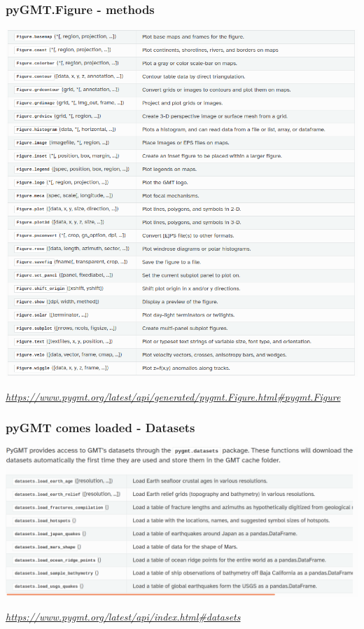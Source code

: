 \documentclass[unknownkeysallowed]{beamer}
\begin{document}
\begin{frame}[fragile=singleslide]
\frametitle{pyGMT.Figure - methods}
	\begin{center}
			\includegraphics[width=\textwidth]{../figures/pygmt_figure_methods.png}	
	\end{center}
	\begin{flushright}
	\vspace{-0.35cm}
	\tiny{\emph{\url{https://www.pygmt.org/latest/api/generated/pygmt.Figure.html\#pygmt.Figure}}}
	\end{flushright}	
\end{frame}


\begin{frame}[fragile=singleslide]
\frametitle{pyGMT comes loaded - Datasets}
	\begin{center}
			\includegraphics[width=\textwidth]{../figures/pygmt_datasets.png}	
	\end{center}
	\begin{flushright}
	\vspace{-0.35cm}
	\tiny{\emph{\url{https://www.pygmt.org/latest/api/index.html\#datasets}}}
	\end{flushright}	
\end{frame}
\end{document}
